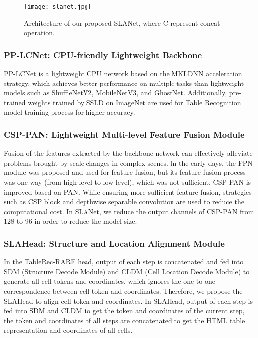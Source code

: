 \documentclass[letterpaper]{article} \usepackage{aaai21}  \usepackage{times}  \usepackage{helvet} \usepackage{courier}  \usepackage[hyphens]{url}  \usepackage{graphicx} \usepackage{algorithm}
\begin{document}
\begin{figure*}[t]
\centering
\texttt{[image: slanet.jpg]}
\caption{Architecture of our proposed SLANet, where C represent concat operation.}
\label{slanet_framework}
\end{figure*}


\subsubsection{PP-LCNet: CPU-friendly Lightweight Backbone}

PP-LCNet\cite{PP-LCNet} is a lightweight CPU network based on the MKLDNN acceleration strategy, which achieves better performance on multiple tasks than lightweight models such as ShuffleNetV2\cite{shufflenet}, MobileNetV3\cite{mobilenetv3}, and GhostNet\cite{ghostnet}. Additionally, pre-trained weights trained by SSLD\cite{SSLD} on ImageNet are used for Table Recognition model training process for higher accuracy.

\subsubsection{CSP-PAN: Lightweight Multi-level Feature Fusion Module}

Fusion of the features extracted by the backbone network can effectively alleviate problems brought by scale changes in complex scenes. In the early days, the FPN\cite{FPN} module was proposed and used for feature fusion, but its feature fusion process was one-way (from high-level to low-level), which was not sufficient. CSP-PAN\cite{PP-PicoDet} is improved based on PAN. While ensuring more sufficient feature fusion, strategies such as CSP block and depthwise separable convolution are used to reduce the computational cost. In SLANet, we reduce the output channels of CSP-PAN from 128 to 96 in order to reduce the model size.

\subsubsection{SLAHead: Structure and Location Alignment Module}

In the TableRec-RARE head, output of each step is concatenated and fed into SDM (Structure Decode Module) and CLDM (Cell Location Decode Module) to generate all cell tokens and coordinates, which ignores the one-to-one correspondence between cell token and coordinates. Therefore, we propose the SLAHead to align cell token and coordinates. In SLAHead, output of each step is fed into SDM and CLDM to get the token and coordinates of the current step, the token and coordinates of all steps are concatenated to get the HTML table representation and coordinates of all cells. 
\end{document}
